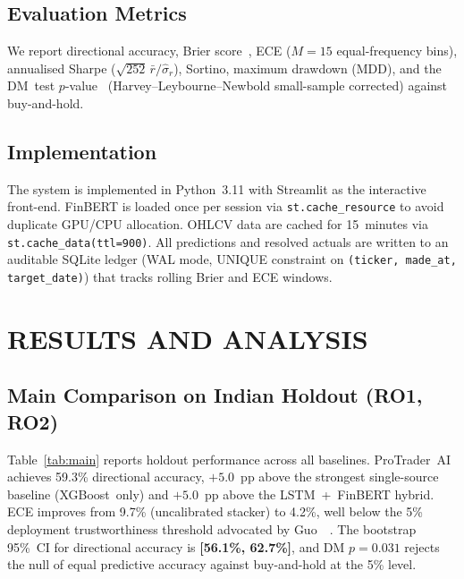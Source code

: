 \subsection{Evaluation Metrics}

We report directional accuracy, Brier score~\cite{zadrozny2002transforming},
ECE ($M=15$ equal-frequency bins), annualised Sharpe
($\sqrt{252}\,\bar{r}/\hat{\sigma}_r$), Sortino, maximum drawdown (MDD),
and the DM~test $p$-value~\cite{diebold1995comparing,harvey1997testing}
(Harvey--Leybourne--Newbold small-sample corrected) against buy-and-hold.

\subsection{Implementation}

The system is implemented in Python~3.11 with Streamlit as the interactive
front-end. FinBERT is loaded once per session via \texttt{st.cache\_resource}
to avoid duplicate GPU/CPU allocation. OHLCV data are cached for 15~minutes
via \texttt{st.cache\_data(ttl=900)}. All predictions and resolved actuals
are written to an auditable SQLite ledger (WAL mode, UNIQUE constraint
on \texttt{(ticker, made\_at, target\_date)}) that tracks rolling Brier and
ECE windows.


\section{RESULTS AND ANALYSIS}
\label{sec:results}

\subsection{Main Comparison on Indian Holdout (RO1, RO2)}

Table~\ref{tab:main} reports holdout performance across all baselines.
ProTrader~AI achieves 59.3\% directional accuracy, $+5.0$~pp above the
strongest single-source baseline (XGBoost~only) and $+5.0$~pp above the
LSTM~+~FinBERT hybrid. ECE improves from 9.7\% (uncalibrated stacker) to
4.2\%, well below the 5\% deployment trustworthiness threshold advocated by
Guo~\etal~\cite{guo2024quant40}. The bootstrap 95\%~CI for directional
accuracy is \textbf{[56.1\%, 62.7\%]}, and DM $p\!=\!0.031$ rejects the
null of equal predictive accuracy against buy-and-hold at the 5\% level.

